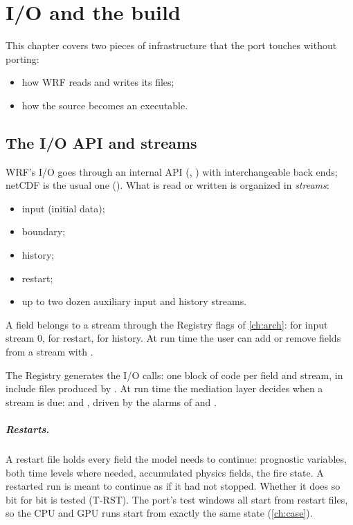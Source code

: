 \chapter{I/O and the build}\label{ch:iobuild}

This chapter covers two pieces of infrastructure that the port touches without porting:
\begin{itemize}
  \item how WRF reads and writes its files;
  \item how the source becomes an executable.
\end{itemize}

\section{The I/O API and streams}

WRF's I/O goes through an internal API (, ) with
interchangeable back ends; netCDF is the usual one (). What is read or written is organized
in \emph{streams}:
\begin{itemize}
  \item input (initial data);
  \item boundary;
  \item history;
  \item restart;
  \item up to two dozen auxiliary input and history streams.
\end{itemize}
A field belongs to a stream through the Registry flags of \cref{ch:arch}:  for input stream 0,  for
restart,  for history. At run time the user can add or remove fields from a stream with
.

The Registry generates the I/O calls: one block of code per field and stream, in include files produced by
. At run time the mediation layer decides when a stream is due: 
and , driven by the alarms of  and .

\paragraph{Restarts.} A restart file holds every field the model needs to continue: prognostic variables, both time
levels where needed, accumulated physics fields, the fire state. A restarted run is meant to continue as if it had not
stopped. Whether it does so bit for bit is tested (T-RST). The port's test windows all start from restart files, so
the CPU and GPU runs start from exactly the same state (\cref{ch:case}).

